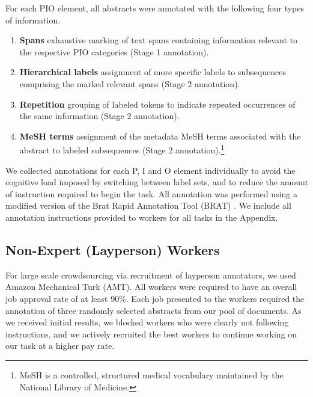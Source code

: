 \documentclass[11pt,a4paper]{article}
\newenvironment{tight_enumerate}{
\begin{enumerate}[leftmargin=4.0mm]
  \setlength{\itemsep}{0pt}
  \setlength{\parskip}{0pt}
}{\end{enumerate}}
\begin{document}
For each PIO element, all abstracts were annotated with the following four types of information.
\begin{enumerate}
\item \textbf{Spans} exhaustive marking of text spans containing information relevant to the respective PIO categories (Stage 1 annotation).
\item \textbf{Hierarchical labels} assignment of more specific labels to subsequences comprising the marked relevant spans (Stage 2 annotation).
\item \textbf{Repetition} grouping of labeled tokens to indicate repeated occurrences of the same information (Stage 2 annotation).
\item \textbf{MeSH terms} assignment of the metadata MeSH terms associated with the abstract to labeled subsequences (Stage 2 annotation).\footnote{MeSH is a controlled, structured medical vocabulary maintained by the National Library of Medicine.}   %
\end{enumerate}

We collected annotations for each P, I and O element individually to avoid the cognitive load imposed by switching between label sets, and to reduce the amount of instruction required to begin the task. All annotation was performed using a modified version of the Brat Rapid Annotation Tool (BRAT) \citep{stenetorp2012brat}. We include all annotation instructions provided to workers for all tasks in the Appendix.



\subsection{Non-Expert (Layperson) Workers}

For large scale crowdsourcing via recruitment of layperson annotators, we used Amazon Mechanical Turk (AMT). All workers were required to have an overall job approval rate of at least 90\%. Each job presented to the workers required the annotation of three randomly selected abstracts from our pool of documents. As we received initial results, we blocked workers who were clearly not following instructions, and we actively recruited the best workers to continue working on our task at a higher pay rate. 
\end{document}

